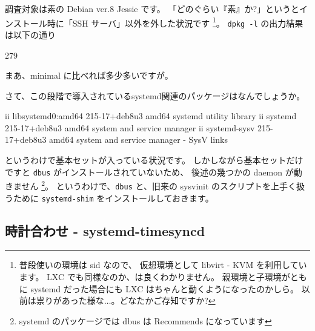 \documentclass[mingoth,a4paper]{jsarticle}
\begin{document}
調査対象は素の Debian ver.8 Jessie です。
「どのぐらい『素』か?」というとインストール時に「SSH サーバ」以外を外した状況です%
\footnote{%
  普段使いの環境は sid なので、%
  仮想環境として libvirt - KVM を利用しています。%
  LXC でも同様なのか、は良くわかりません。%
  親環境と子環境がともに systemd だった場合にも LXC はちゃんと動くようになったのかしら。%
  以前は祟りがあった様な$\dots$。どなたかご存知ですか?%
}。
\verb|dpkg -l| の出力結果は以下の通り
\begin{commandline}
  279
\end{commandline}
\noindent%
まあ、minimal に比べれば多少多いですが。

さて、この段階で導入されているsystemd関連のパッケージはなんでしょうか。
\begin{commandline}
   ii  libsystemd0:amd64  215-17+deb8u3  amd64  systemd utility library
   ii  systemd            215-17+deb8u3  amd64  system and service manager
   ii  systemd-sysv       215-17+deb8u3  amd64  system and service manager - SysV links
\end{commandline}
\noindent%
というわけで基本セットが入っている状況です。
しかしながら基本セットだけですと \verb|dbus| がインストールされていないため、
後述の幾つかの daemon が動きません%
\footnote{systemd のパッケージでは dbus は Recommends になっています}。
というわけで、\verb|dbus| と、旧来の sysvinit のスクリプトを上手く扱うために \verb|systemd-shim| をインストールしておきます。
\begin{commandline}
\end{commandline}

\subsection{時計合わせ - systemd-timesyncd}
\end{document}
